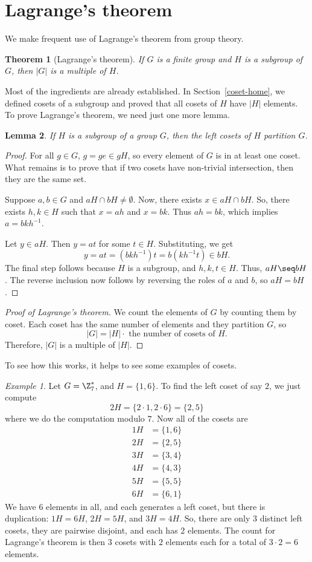 \documentclass[12pt]{amsart}
\theoremstyle{plain}
\newtheorem{thm}{Theorem}[section]
\newtheorem{lemma}[thm]{Lemma}
\theoremstyle{definition}
\theoremstyle{remark}
\newtheorem*{exam}{Example}
\begin{document}
\section{Lagrange's theorem}
We make frequent use of Lagrange's theorem from group theory.
\begin{thm}[Lagrange's theorem]
  If $G$ is a finite group and $H$ is a subgroup of $G$, then $|G|$ is
  a multiple of $H$.
\end{thm}
Most of the ingredients are already established.  In
Section~\ref{coset-home}, we defined cosets of a subgroup and proved
that all cosets of $H$ have $|H|$ elements.  To prove Lagrange's
theorem, we need just one more lemma.
\begin{lemma}
  If $H$ is a subgroup of a group $G$, then the left cosets of $H$
  partition $G$.
\end{lemma}
\begin{proof}
  For all $g\in G$, $g=ge\in gH$, so every element of $G$ is in at
  least one coset.  What remains is to prove that if two cosets have
  non-trivial intersection, then they are the same set.

  Suppose $a,b\in G$ and $aH\cap bH\neq \emptyset$.  Now, there exists
  $x\in aH\cap bH$.  
  So, there exists $h,k\in H$
  such that $x=ah$ and $x=bk$.  Thus $ah=bk$, which implies
  $a=bkh^{-1}$.  

  Let $y\in aH$.  Then $y=at$ for some $t\in H$.
  Substituting, we get
  \[ y = at = (bkh^{-1}) t = b(kh^{-1} t)\in bH.\]
  The final step follows because $H$ is a subgroup, and $h,k,t\in H$.
  Thus, $aH\seq bH$.  The reverse inclusion now follows by reversing
  the roles of $a$ and $b$, so $aH=bH$. 
\end{proof}
\begin{proof}[Proof of Lagrange's theorem]
  We count the elements of $G$ by counting them by coset.  Each coset
  has the same number of elements and they partition $G$, so 
  \[ |G| = |H|\cdot \text{ the number of cosets of $H$.}\]
  Therefore, $|G|$ is a multiple of $|H|$.
\end{proof}
To see how this works, it helps to see some examples of cosets.
\begin{exam}
  Let $G=\Z_7^*$, and $H=\{1,6\}$.  To find the left coset of say $2$,
  we just compute
  \[ 2H = \{2\cdot 1, 2\cdot 6\} = \{2, 5\}\]
  where we do the computation modulo $7$.  Now all of the cosets are
  \begin{align*}
    1H &= \{1, 6\} \\
    2H &= \{2, 5\} \\
    3H &= \{3, 4\} \\
    4H &= \{4, 3\} \\
    5H &= \{5, 5\} \\
    6H &= \{6, 1\} 
  \end{align*}
  We have $6$ elements in all, and each generates a left coset, but
  there is duplication: $1H=6H$, $2H=5H$, and $3H=4H$.  So, there are
  only $3$ distinct left cosets, they are pairwise disjoint, and each
  has $2$ elements.  The count for Lagrange's theorem is then $3$
  cosets with $2$ elements each for a total of $3\cdot 2=6$ elements.
\end{exam}
\end{document}
